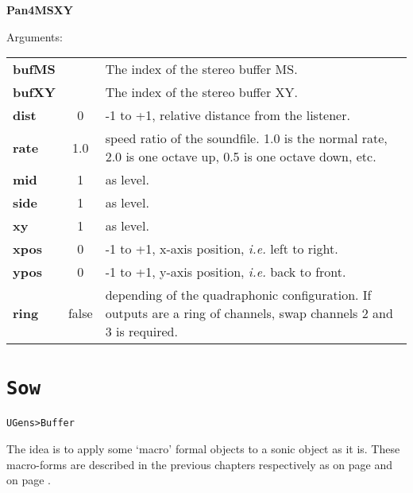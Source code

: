 \begin{addmargin}[1em]{0em}%
\begin{mdframed}[style=mystyle]

\bigskip

{\large \textbf{Pan4MSXY}}

\hrulefill

\color{gray!80}Arguments:\color{black} 

\bigskip

\begin{tabular}{l c p{7.5cm}}
\textbf{bufMS} &  & The index of the stereo buffer MS.\\
\textbf{bufXY} &  & The index of the stereo buffer XY.\\
\textbf{dist} & 0 &  -1 to +1, relative distance from the listener. \\
\textbf{rate} & 1.0 & speed ratio  of the soundfile. 1.0 is the normal rate, 2.0 is one octave up, 0.5 is one octave down, etc.\\
\textbf{mid} & 1 & as level. \\
\textbf{side} & 1 &  as level.\\
\textbf{xy} & 1 & as level.\\
\textbf{xpos} & 0 &  -1 to +1, x-axis position, \textit{i.e.} left to right.\\
\textbf{ypos} & 0 &  -1 to +1, y-axis position, \textit{i.e.} back to front.\\
\textbf{ring} & false & depending of the quadraphonic configuration. If outputs are a ring of channels, swap channels 2 and 3 is required.
\end{tabular}

\bigskip

\end{mdframed}
\end{addmargin}


\section{\texttt{Sow}}
\label{cfso}

\texttt{UGens>Buffer}

\bigskip

The idea is to apply some `macro' formal objects to a sonic object as it is. These macro-forms are described in the previous chapters respectively as  on page \pageref{imp2} and  on page \pageref{imp3}.

